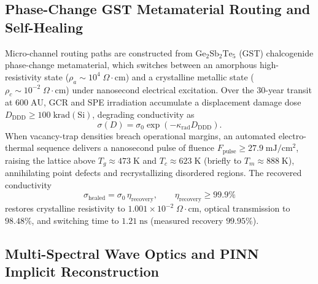 \documentclass[10pt,twocolumn]{IEEEtran}
\begin{document}
\subsection{Phase-Change GST Metamaterial Routing and Self-Healing}
\label{sec:metamaterial}

Micro-channel routing paths are constructed from
$\mathrm{Ge}_2\mathrm{Sb}_2\mathrm{Te}_5$ (GST) chalcogenide
phase-change metamaterial, which switches between an amorphous
high-resistivity state ($\rho_a\sim10^{4}\;\Omega\cdot\mathrm{cm}$) and
a crystalline metallic state
($\rho_c\sim10^{-2}\;\Omega\cdot\mathrm{cm}$) under nanosecond
electrical excitation.  Over the 30-year transit at $600\;\mathrm{AU}$,
GCR and SPE irradiation accumulate a displacement damage dose
$D_{\mathrm{DDD}}\geq100\;\mathrm{krad(Si)}$, degrading conductivity as
\begin{equation}
\sigma(D)=\sigma_0\exp\left(-\kappa_{\mathrm{rad}}D_{\mathrm{DDD}}\right).
\label{eq:ddd_conductivity}
\end{equation}
When vacancy-trap densities breach operational margins, an automated
electro-thermal sequence delivers a nanosecond pulse of fluence
$F_{\mathrm{pulse}}\geq27.9\;\mathrm{mJ/cm^{2}}$, raising the lattice
above $T_g\approx473\;\mathrm{K}$ and $T_c\approx623\;\mathrm{K}$
(briefly to $T_m\approx888\;\mathrm{K}$), annihilating point defects and
recrystallizing disordered regions.  The recovered conductivity
\begin{equation}
\sigma_{\mathrm{healed}}=\sigma_0\,\eta_{\mathrm{recovery}},\qquad
\eta_{\mathrm{recovery}}\geq99.9\%
\label{eq:healing_recovery}
\end{equation}
restores crystalline resistivity to $1.001\times10^{-2}\;\Omega\cdot\mathrm{cm}$,
optical transmission to $98.48\%$, and switching time to
$1.21\;\mathrm{ns}$ (measured recovery $99.95\%$).

\subsection{Multi-Spectral Wave Optics and PINN Implicit Reconstruction}
\label{sec:pinn_optics}
\end{document}
